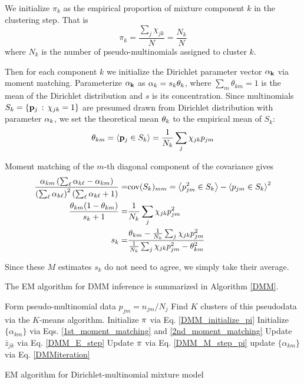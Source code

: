 \documentclass[nofootinbib,amssymb,amsmath]{revtex4}
\begin{document}
We initialize $\pi_k$ as the empirical proportion of mixture component $k$ in the clustering step.  That is
\begin{equation}
\label{DMM_initialize_pi}
\pi_k = \frac{\sum_j \chi_{jk}}{N} = \frac{N_k}{N}
\end{equation}
where $N_k$ is the number of pseudo-multinomials assigned to cluster $k$.

Then for each component $k$ we initialize the Dirichlet parameter vector ${\bf \alpha_k}$ via moment matching.  Parameterize ${\bf \alpha_k}$ as ${\bf \alpha}_k = s_k {\bf \theta}_k$, where $\sum_m \theta_{km} = 1$ is the mean of the Dirichlet distribution and $s$ is its concentration.  Since multinomials $S_k = \{ {\bf p}_j \, : \, \chi_{jk} = 1 \}$ are presumed drawn from Dirichlet distribution with parameter ${\bf \alpha}_k$, we set the theoretical mean ${\bf \theta}_k$ to the empirical mean of $S_k$:
\begin{equation}
\theta_{km} = \left\langle   {\bf p}_j \in S_k \right\rangle = \frac{1}{N_k} \sum_j \chi_{jk} p_{jm}
\label{1st_moment_matching}
\end{equation}

Moment matching of the $m$-th diagonal component of the covariance gives
\begin{align}
\frac{ \alpha_{km} \left( \sum_\ell \alpha_{k \ell} - \alpha_{km} \right) }{\left( \sum_\ell \alpha_{k \ell}\right)^2 \left( \sum_\ell \alpha_{k \ell} + 1 \right) }=& {\rm cov}(S_k)_{mm} =  \left\langle   p_{jm}^2 \in S_k \right\rangle - \left\langle   p_{jm} \in S_k \right\rangle^2 \\
%
\frac{ \theta_{km} (1 - \theta_{km})} {s_k + 1} =& \frac{1}{N_k} \sum_j \chi_{jk} p^2_{jm} \\
s_k = & \frac{  \theta_{km} - \frac{1}{N_k} \sum_j \chi_{jk} p^2_{jm}}{\frac{1}{N_k} \sum_j \chi_{jk} p^2_{jm} - \theta_{km}^2 }
\label{2nd_moment_matching}
\end{align}

Since these $M$ estimates $s_k$ do not need to agree, we simply take their average.


The EM algorithm for DMM inference is summarized in Algorithm \ref{DMM}.

\begin{algorithm}
\begin{algorithmic}[1]
\State Form pseudo-multinomial data $p_{jm} = n_{jm} / N_j$
\State Find $K$ clusters of this pseudodata via the $K$-means algorithm.
\State Initialize ${\bf \pi}$ via Eq. \ref{DMM_initialize_pi}
\State Initialize $\{ \alpha_{km} \}$ via Eqs. \ref{1st_moment_matching} and \ref{2nd_moment_matching}
\Repeat
	\State Update $\bar{z}_{jk}$ via Eq. \ref{DMM_E_step}
	\State Update ${ \bf \pi}$ via Eq. \ref{DMM_M_step_pi}
		\Repeat
		\State update $ \{ \alpha_{km} \}$ via Eq. \ref{DMMiteration}
\end{algorithmic}
\caption{EM algorithm for Dirichlet-multinomial mixture model}
\label{DMM}
\end{algorithm}
\end{document}
